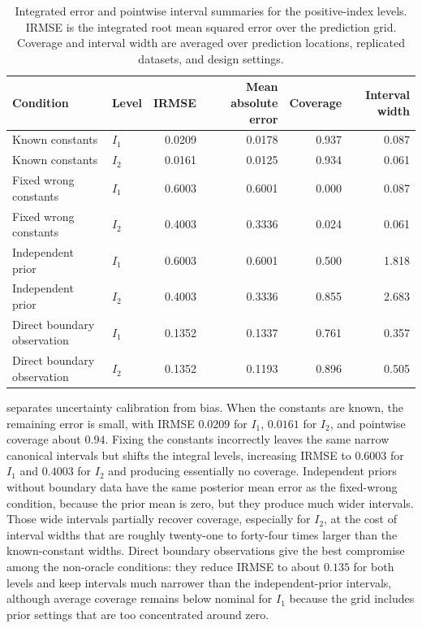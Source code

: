 \documentclass[11pt,a4paper]{article}
\theoremstyle{definition}
\theoremstyle{remark}
\begin{document}
\begin{table}[htbp]
\centering
\caption{\label{tab:boundary-constant-integral-error}Integrated error and pointwise interval summaries for the positive-index levels. IRMSE is the integrated root mean squared error over the prediction grid. Coverage and interval width are averaged over prediction locations, replicated datasets, and design settings.}
\begin{tabular}{llrrrr}
Condition & Level & IRMSE & Mean absolute error & Coverage & Interval width \\
\midrule
Known constants & \(I_1\) & 0.0209 & 0.0178 & 0.937 & 0.087 \\
Known constants & \(I_2\) & 0.0161 & 0.0125 & 0.934 & 0.061 \\
Fixed wrong constants & \(I_1\) & 0.6003 & 0.6001 & 0.000 & 0.087 \\
Fixed wrong constants & \(I_2\) & 0.4003 & 0.3336 & 0.024 & 0.061 \\
Independent prior & \(I_1\) & 0.6003 & 0.6001 & 0.500 & 1.818 \\
Independent prior & \(I_2\) & 0.4003 & 0.3336 & 0.855 & 2.683 \\
Direct boundary observation & \(I_1\) & 0.1352 & 0.1337 & 0.761 & 0.357 \\
Direct boundary observation & \(I_2\) & 0.1352 & 0.1193 & 0.896 & 0.505 \\
\end{tabular}

\end{table}

 separates uncertainty calibration from bias. When the constants are known, the remaining error is small, with IRMSE \(0.0209\) for \(I_1\), \(0.0161\) for \(I_2\), and pointwise coverage about \(0.94\). Fixing the constants incorrectly leaves the same narrow canonical intervals but shifts the integral levels, increasing IRMSE to \(0.6003\) for \(I_1\) and \(0.4003\) for \(I_2\) and producing essentially no coverage. Independent priors without boundary data have the same posterior mean error as the fixed-wrong condition, because the prior mean is zero, but they produce much wider intervals. Those wide intervals partially recover coverage, especially for \(I_2\), at the cost of interval widths that are roughly twenty-one to forty-four times larger than the known-constant widths. Direct boundary observations give the best compromise among the non-oracle conditions: they reduce IRMSE to about \(0.135\) for both levels and keep intervals much narrower than the independent-prior intervals, although average coverage remains below nominal for \(I_1\) because the grid includes prior settings that are too concentrated around zero.
\end{document}
